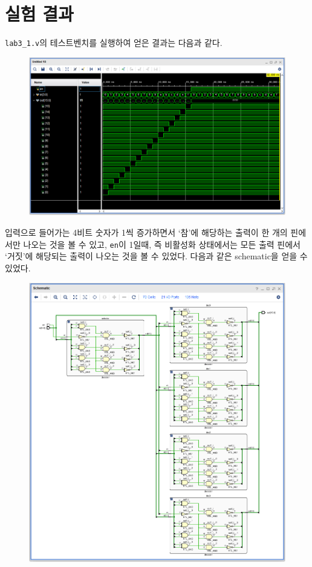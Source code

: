 \documentclass{scrartcl}
\begin{document}
\section{실험 결과}
\texttt{lab3\_1.v}의 테스트벤치를 실행하여 얻은 결과는 다음과 같다.
\begin{figure}[H]
  \centering
  \includegraphics[width=\linewidth]{lab3_1_waveform}
\end{figure}
입력으로 들어가는 4비트 숫자가 1씩 증가하면서 `참'에 해당하는 출력이 한 개의 핀에서만 나오는 것을 볼 수 있고, \texttt{en}이 1일때, 즉 비활성화 상태에서는 모든 출력 핀에서 `거짓'에 해당되는 출력이 나오는 것을 볼 수 있었다.
다음과 같은 schematic을 얻을 수 있었다.
\begin{figure}[H]
  \centering
  \includegraphics[width=\linewidth]{lab3_1_schematic_expanded}
\end{figure}
\end{document}
